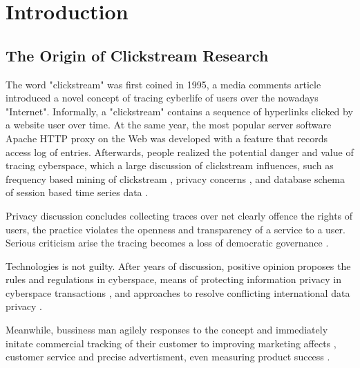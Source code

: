 \section{Introduction}
\label{ch:intro}

\subsection{The Origin of Clickstream Research}



The word "clickstream" \cite{friedman1995} was first coined in 1995, a media comments article 
introduced a novel concept of tracing cyberlife of users over the nowadays "Internet". Informally,
a "clickstream" contains a sequence of hyperlinks clicked by a website user over time.
At the same year, the most popular server software Apache HTTP \cite{apache1995http} proxy on the Web was developed with a feature
that records access log of entries.
Afterwards, people realized the potential danger and value of tracing cyberspace, which  a
large discussion of clickstream influences, such as frequency based mining of clickstream \cite{brodwin1995},
privacy concerns \cite{reidenberg1996governing}, and database schema of session based time series data \cite{courtheoux2000database}.


Privacy discussion concludes collecting traces over net clearly offence the rights of users,
the practice violates the openness and transparency of a service to a user.
Serious criticism arise the tracing becomes a loss of democratic governance \cite{gindin1997lost}.

Technologies is not guilty. After years of discussion, positive opinion proposes the rules 
\cite{reidenberg1996governing} and regulations \cite{skok1999establishing} in cyberspace,
means of protecting information privacy in cyberspace transactions \cite{kang1997information},
and approaches to resolve conflicting international data privacy \cite{reidenberg1999resolving}.

Meanwhile, bussiness man agilely responses to the concept and immediately initate 
commercial tracking of their customer to improving marketing affects \cite{novick1995}, 
customer service and precise advertisment\cite{reagle1999platform, bucklin2000sticky}, 
even measuring product success \cite{schonberg2000measuring}.

